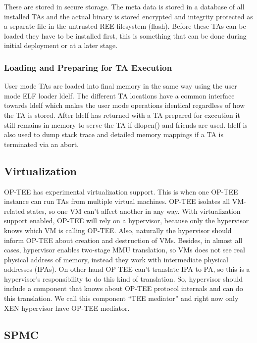 \documentclass{article}
\begin{document}
These are stored in secure storage. The meta data is stored in a database of all installed TAs and the actual binary is stored encrypted and integrity protected as a separate file in the untrusted REE filesystem (flash). Before these TAs can be loaded they have to be installed first, this is something that can be done during initial deployment or at a later stage.

\subsubsection{Loading and Preparing for TA Execution}

User mode TAs are loaded into final memory in the same way using the user mode ELF loader ldelf. The different TA locations have a common interface towards ldelf which makes the user mode operations identical regardless of how the TA is stored. After ldelf has returned with a TA prepared for execution it still remains in memory to serve the TA if dlopen() and friends are used. ldelf is also used to dump stack trace and detailed memory mappings if a TA is terminated via an abort.

\subsection{Virtualization}

OP-TEE has experimental virtualization support. This is when one OP-TEE instance can run TAs from multiple virtual machines. OP-TEE isolates all VM-related states, so one VM can’t affect another in any way. With virtualization support enabled, OP-TEE will rely on a hypervisor, because only the hypervisor knows which VM is calling OP-TEE. Also, naturally the hypervisor should inform OP-TEE about creation and destruction of VMs. Besides, in almost all cases, hypervisor enables two-stage MMU translation, so VMs does not see real physical address of memory, instead they work with intermediate physical addresses (IPAs). On other hand OP-TEE can’t translate IPA to PA, so this is a hypervisor’s responsibility to do this kind of translation. So, hypervisor should include a component that knows about OP-TEE protocol internals and can do this translation. We call this component “TEE mediator” and right now only XEN hypervisor have OP-TEE mediator.

\subsection{SPMC}
\end{document}

